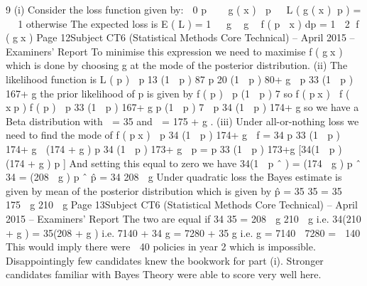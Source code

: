 9
(i)
Consider the loss function given by:
 0 p    g ( x )  p  
L ( g ( x ) p ) = 
 1 otherwise
The expected loss is
E ( L ) = 1  
g 
g 
f ( p  x ) dp
= 1  2 f ( gx )
Page 12Subject CT6 (Statistical Methods Core Technical) – April 2015 – Examiners’ Report
To minimise this expression we need to maximise f ( gx ) which is done by
choosing g at the mode of the posterior distribution.
(ii)
The likelihood function is L ( p )  p 13 (1  p ) 87 p 20 (1  p ) 80+ g
 p 33 (1  p ) 167+ g
the prior likelihood of p is given by f ( p )  p (1  p ) 7
so f ( px )  f ( xp ) f ( p )
 p 33 (1  p ) 167+ g p (1  p ) 7
 p 34 (1  p ) 174+ g
so we have a Beta distribution with  = 35 and  = 175 + g .
(iii)
Under all-or-nothing loss we need to find the mode of
f ( px )  p 34 (1  p ) 174+ g
 f
= 34 p 33 (1  p ) 174+ g  (174 + g ) p 34 (1  p ) 173+ g
 p
= p 33 (1  p ) 173+g [34(1  p )  (174 + g ) p ]
And setting this equal to zero we have
34(1  p ˆ ) = (174  g ) p ˆ
34 = (208  g ) p ˆ
p̂ =
34
208  g
Under quadratic loss the Bayes estimate is given by mean of the posterior
distribution which is given by
p̂ =
35
35
=
35  175  g 210  g
Page 13Subject CT6 (Statistical Methods Core Technical) – April 2015 – Examiners’ Report
The two are equal if
34
35
=
208  g
210  g
i.e. 34(210 + g ) = 35(208 + g )
i.e. 7140 + 34 g = 7280 + 35 g
i.e. g = 7140  7280 =  140
This would imply there were  40 policies in year 2 which is impossible.
Disappointingly few candidates knew the bookwork for part (i). Stronger candidates familiar
with Bayes Theory were able to score very well here.

